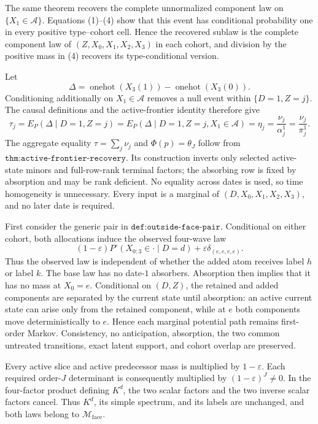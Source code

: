The same theorem recovers the complete unnormalized component law on \(\{X_1\in\mathcal A\}\).  Equations (1)--(4) show that this event has conditional probability one in every positive type--cohort cell.  Hence the recovered sublaw is the complete component law of \((Z,X_0,X_1,X_2,X_3)\) in each cohort, and division by the positive mass in (4) recovers its type-conditional version.

Let
\[
 \Delta=\operatorname{onehot}(X_3(1))-\operatorname{onehot}(X_3(0)).
\]
Conditioning additionally on \(X_1\in\mathcal A\) removes a null event within \(\{D=1,Z=j\}\).  The causal definitions and the active-frontier identity therefore give
\[
 \tau_j=E_P(\Delta\mid D=1,Z=j)
 =E_P(\Delta\mid D=1,Z=j,X_1\in\mathcal A)
 =\eta_j=\frac{\nu_j}{\alpha_j^1}
 =\frac{\nu_j}{\pi_j^1}.
\tag{5}
\]
The aggregate equality \(\tau=\sum_j\nu_j\) and \(\Phi(p)=\theta_J\) follow from \(\texttt{thm:active-frontier-recovery}\).  Its construction inverts only selected active-state minors and full-row-rank terminal factors; the absorbing row is fixed by absorption and may be rank deficient.  No equality across dates is used, so time homogeneity is unnecessary.  Every input is a marginal of \((D,X_0,X_1,X_2,X_3)\), and no later date is required.

First consider the generic pair in \(\texttt{def:outside-face-pair}\).  Conditional on either cohort, both allocations induce the observed four-wave law
\[
 (1-\varepsilon)P^\circ(X_{0:3}\in\cdot\mid D=d)
 +\varepsilon\delta_{(e,e,e,e)}.
\tag{1}
\]
Thus the observed law is independent of whether the added atom receives label \(h\) or label \(k\).  The base law has no date-\(1\) absorbers.  Absorption then implies that it has no mass at \(X_0=e\).  Conditional on \((D,Z)\), the retained and added components are separated by the current state until absorption: an active current state can arise only from the retained component, while at \(e\) both components move deterministically to \(e\).  Hence each marginal potential path remains first-order Markov.  Consistency, no anticipation, absorption, the two common untreated transitions, exact latent support, and cohort overlap are preserved.

Every active slice and active predecessor mass is multiplied by \(1-\varepsilon\).  Each required order-\(J\) determinant is consequently multiplied by \((1-\varepsilon)^J\ne0\).  In the four-factor product defining \(K^d\), the two scalar factors and the two inverse scalar factors cancel.  Thus \(K^d\), its simple spectrum, and its labels are unchanged, and both laws belong to \(\mathcal M_{\mathrm{face}}\).

